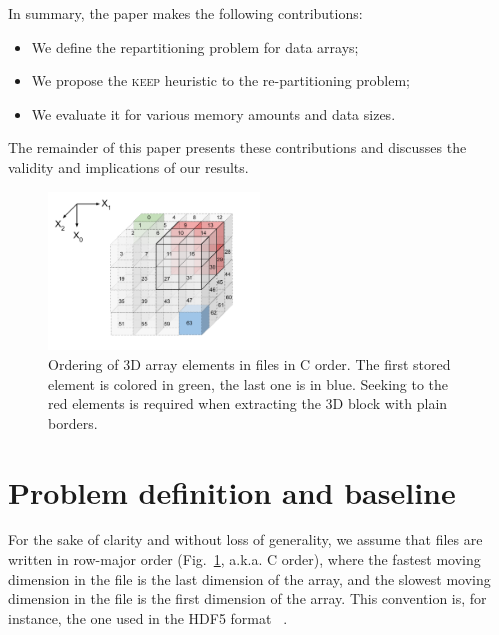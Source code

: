 \documentclass[sigconf, nonacm]{acmart}
\newcommand{\keep}[0]{\textsc{keep}\xspace}
\begin{document}
In summary, the paper makes the following contributions:
\begin{itemize}
  \item We define the repartitioning problem for data arrays;
  \item We propose the \keep heuristic to the re-partitioning problem;
  \item We evaluate it for various memory amounts and data sizes.
\end{itemize}
The remainder of this paper presents these contributions and discusses the
validity and implications of our results.


\begin{figure}
  \centering
  \includegraphics[width=0.5\textwidth]{./figures/figure_1.pdf}
  \caption{Ordering of 3D array elements in files in C order. The first stored element is colored in green,
  the last one is in blue. Seeking to the red elements is required when extracting the 3D block with plain borders.}
  \label{fig:seeks_and_rowmajor}
\end{figure}

\section{Problem definition and baseline}


For the sake of clarity and without loss of generality, we assume that
 files are written in row-major order (Fig.~\ref{fig:seeks_and_rowmajor},
 a.k.a. C order), where the fastest moving dimension in the file is the
 last dimension of the array, and the slowest moving dimension in the file
 is the first dimension of the array. This convention is, for instance, the
 one used in the HDF5 format ~\cite{hdf5}.
\end{document}
